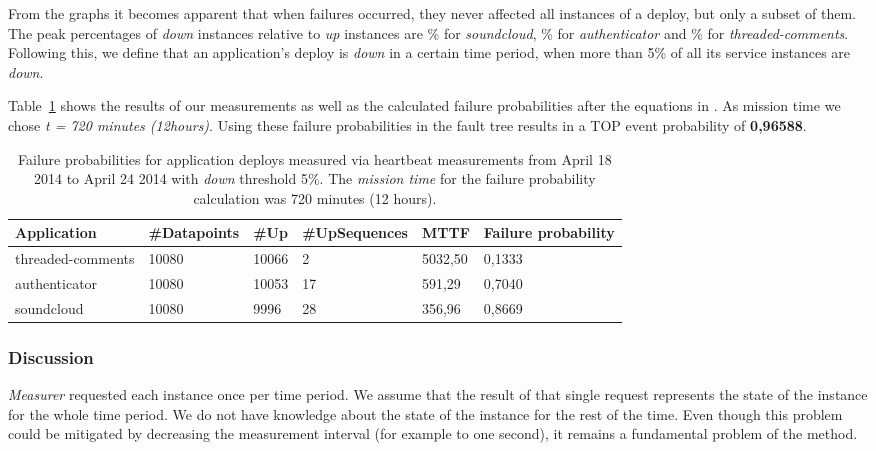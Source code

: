 From the graphs it becomes apparent that when failures occurred, they never affected all instances of a deploy, but only a subset of them. The peak percentages of \emph{down} instances relative to \emph{up} instances are \% for \emph{soundcloud}, \% for \emph{authenticator} and \% for \emph{threaded-comments}. Following this, we define that an application's deploy is \emph{down} in a certain time period, when more than 5\% of all its service instances are \emph{down}.

Table~\ref{tab:heartbeat_failure_probs} shows the results of our measurements as well as the calculated failure probabilities after the equations in . As mission time we chose \emph{t = 720 minutes (12hours)}. Using these failure probabilities in the fault tree results in a TOP event probability of \textbf{0,96588}.

\begin{table}[ht]
  \caption{Failure probabilities for application deploys measured via heartbeat measurements from April 18 2014 to April 24 2014 with \emph{down} threshold 5\%. The \emph{mission time} for the failure probability calculation was 720 minutes (12 hours).}
  \label{tab:heartbeat_failure_probs}
  \begin{adjustwidth}{-0.5in}{-.5in}
  \begin{tabular}{ |l|l|l|l|l|l| }
    \hline
    Application & \#Datapoints & \#Up & \#UpSequences & MTTF & Failure probability \\
    \hline
    threaded-comments & 10080 & 10066 & 2 & 5032,50 & 0,1333 \\
    authenticator & 10080 & 10053 & 17 & 591,29 & 0,7040 \\
    soundcloud & 10080 & 9996 & 28 & 356,96 & 0,8669 \\
    \hline
  \end{tabular}
  \end{adjustwidth}
\end{table}

\subsubsection{Discussion}

\emph{Measurer} requested each instance once per time period. We assume that the result of that single request represents the state of the instance for the whole time period. We do not have knowledge about the state of the instance for the rest of the time. Even though this problem could be mitigated by decreasing the measurement interval (for example to one second), it remains a fundamental problem of the method.

